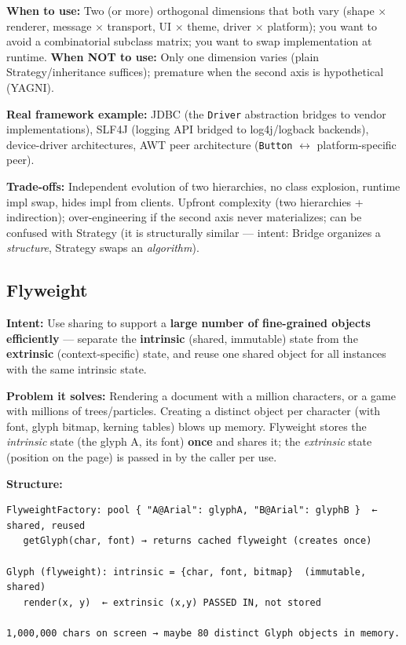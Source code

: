\documentclass[11pt]{article}
\begin{document}
\textbf{When to use:} Two (or more) orthogonal dimensions that both vary (shape \(\times\) renderer, message \(\times\) transport, UI \(\times\) theme, driver \(\times\) platform); you want to avoid a combinatorial subclass matrix; you want to swap implementation at runtime. \textbf{When NOT to use:} Only one dimension varies (plain Strategy/inheritance suffices); premature when the second axis is hypothetical (YAGNI).

\textbf{Real framework example:} JDBC (the \texttt{Driver} abstraction bridges to vendor implementations), SLF4J (logging API bridged to log4j/logback backends), device-driver architectures, AWT peer architecture (\texttt{Button} \(\leftrightarrow\) platform-specific peer).

\textbf{Trade-offs:} Independent evolution of two hierarchies, no class explosion, runtime impl swap, hides impl from clients. Upfront complexity (two hierarchies + indirection); over-engineering if the second axis never materializes; can be confused with Strategy (it is structurally similar --- intent: Bridge organizes a \emph{structure}, Strategy swaps an \emph{algorithm}).

\subsection{Flyweight}\label{flyweight}

\textbf{Intent:} Use sharing to support a \textbf{large number of fine-grained objects efficiently} --- separate the \textbf{intrinsic} (shared, immutable) state from the \textbf{extrinsic} (context-specific) state, and reuse one shared object for all instances with the same intrinsic state.

\textbf{Problem it solves:} Rendering a document with a million characters, or a game with millions of trees/particles. Creating a distinct object per character (with font, glyph bitmap, kerning tables) blows up memory. Flyweight stores the \emph{intrinsic} state (the glyph \textquotesingle A\textquotesingle, its font) \textbf{once} and shares it; the \emph{extrinsic} state (position on the page) is passed in by the caller per use.

\textbf{Structure:}

\setcodelang{}

\begin{verbatim}
FlyweightFactory: pool { "A@Arial": glyphA, "B@Arial": glyphB }  ← shared, reused
   getGlyph(char, font) → returns cached flyweight (creates once)

Glyph (flyweight): intrinsic = {char, font, bitmap}  (immutable, shared)
   render(x, y)  ← extrinsic (x,y) PASSED IN, not stored

1,000,000 chars on screen → maybe 80 distinct Glyph objects in memory.
\end{verbatim}
\end{document}

